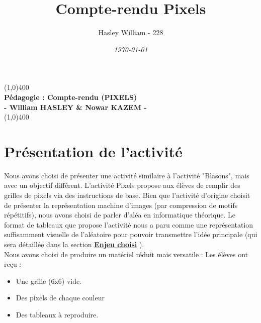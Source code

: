 \documentclass{article}
\title{\textbf{Compte-rendu Pixels}}
\date{\textit{\today}}
\author{Hasley William - 228}
\begin{document}
\begin{titlepage}

\begin{center}

\vfill
\line(1,0){400}\\
\huge{\textbf{Pédagogie : Compte-rendu (PIXELS)}}\\[3mm]
\Large{\textbf{- William HASLEY \& Nowar KAZEM - }}\\[1mm]
\line(1,0){400}
\vfill
\end{center}


\begin{flushleft}

\renewcommand{\contentsname}{Sommaire}  %
\tableofcontents
\vfill
\end{flushleft}

\end{titlepage}

\newpage

\section{Présentation de l'activité}

Nous avons choisi de présenter une activité similaire à l'activité "Blasons", mais avec un objectif différent. L'activité Pixels propose aux élèves de remplir des grilles de pixels via des instructions de base. Bien que l'activité d'origine choisit de présenter la représentation machine d'images (par compression de motifs répétitifs), nous avons choisi de parler d'aléa en informatique théorique. Le format de tableaux que propose l'activité nous a paru comme une représentation suffisamment visuelle de l'aléatoire pour pouvoir transmettre l'idée principale (qui sera détaillée dans la section  \hyperref[sec:enjeu]{\textbf{\underline{Enjeu choisi}}} ).\\

Nous avons choisi de produire un matériel réduit mais versatile : Les élèves ont reçu : \begin{itemize}
\item Une grille (6x6) vide.
\item Des pixels de chaque couleur
\item Des tableaux à reproduire.
\end{itemize}

\bigskip
\end{document}
